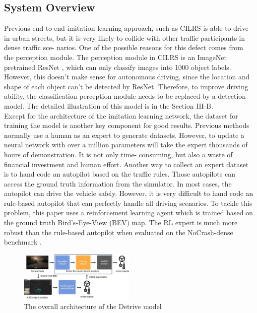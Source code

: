 \documentclass[conference]{IEEEtran}
\begin{document}
\subsection{System Overview}

Previous end-to-end imitation learning approach, such as CILRS \cite{codevilla2018end} is able to drive in urban streets, but it is very likely to collide with other traffic participants in dense traffic sce- narios. One of the possible reasons for this defect comes from the perception module. The perception module in CILRS is an ImageNet pretrained ResNet \cite{he2016deep}, which can only classify images into 1000 object labels. However, this doesn't make sense for autonomous driving, since the location and shape of each object can't be detected by ResNet. Therefore, to improve driving ability, the classification perception module needs to be replaced by a detection model. The detailed illustration of this model is in the Section III-B.
\\
Except for the architecture of the imitation learning network, the dataset for training the model is another key component for good results. Previous methods normally use a human as an expert to generate datasets. However, to update a neural network with over a million parameters will take the expert thousands of hours of demonstration. It is not only time- consuming, but also a waste of financial investment and human effort. Another way to collect an expert dataset is to hand code an autopilot based on the traffic rules. Those autopilots can access the ground truth information from the simulator. In most cases, the autopilot can drive the vehicle safely. However, it is very difficult to hand code an rule-based autopilot that can perfectly handle all driving scenarios. To tackle this problem, this paper uses a reinforcement learning agent which is trained based on the ground truth Bird's-Eye-View (BEV) map. The RL expert is much more robust than the rule-based autopilot when evaluated on the NoCrash-dense benchmark \cite{zhang2021end}.

\begin{figure}[htbp]
    \centering
    \includegraphics[width=0.5\textwidth]{2.png}
    \caption{The overall architecture of the Detrive model}
    \label{fig:2}
\end{figure}
\end{document}
